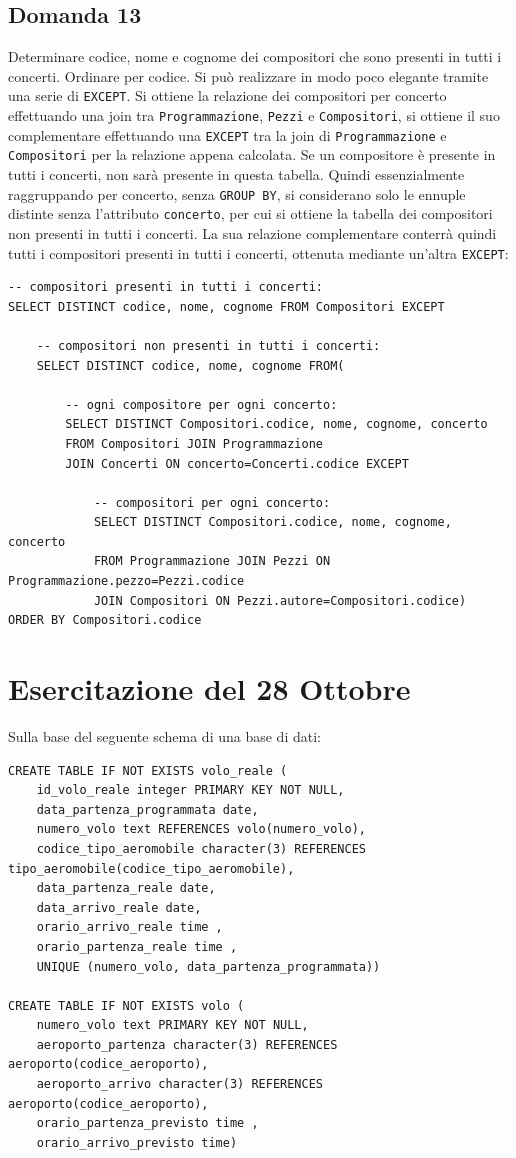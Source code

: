 \documentclass{article}
\numberwithin{equation}{subsection}
\begin{document}
\subsection{Domanda 13}
Determinare codice, nome e cognome dei compositori che sono presenti in tutti i concerti. Ordinare per codice. Si può realizzare in modo poco elegante tramite una serie di \verb|EXCEPT|. Si ottiene la 
relazione dei compositori per concerto effettuando una join tra \verb|Programmazione|, \verb|Pezzi| e \verb|Compositori|, si ottiene il suo complementare effettuando una \verb|EXCEPT| tra la join di \verb|Programmazione| e 
\verb|Compositori| per la relazione appena calcolata. Se un compositore è presente in tutti i concerti, non sarà presente in questa tabella. Quindi essenzialmente raggruppando per concerto, senza \verb|GROUP BY|, si 
considerano solo le ennuple distinte senza l'attributo \verb|concerto|, per cui si ottiene la tabella dei compositori non presenti in tutti i concerti. La sua relazione complementare conterrà quindi tutti i compositori 
presenti in tutti i concerti, ottenuta mediante un'altra \verb|EXCEPT|:
\begin{verbatim}
-- compositori presenti in tutti i concerti:
SELECT DISTINCT codice, nome, cognome FROM Compositori EXCEPT
    
    -- compositori non presenti in tutti i concerti:
    SELECT DISTINCT codice, nome, cognome FROM(

        -- ogni compositore per ogni concerto:
        SELECT DISTINCT Compositori.codice, nome, cognome, concerto
        FROM Compositori JOIN Programmazione 
        JOIN Concerti ON concerto=Concerti.codice EXCEPT

            -- compositori per ogni concerto:
            SELECT DISTINCT Compositori.codice, nome, cognome, concerto
            FROM Programmazione JOIN Pezzi ON Programmazione.pezzo=Pezzi.codice
            JOIN Compositori ON Pezzi.autore=Compositori.codice)
ORDER BY Compositori.codice
\end{verbatim}

\clearpage

\section{Esercitazione del 28 Ottobre}

Sulla base del seguente schema di una base di dati:
\begin{verbatim}
CREATE TABLE IF NOT EXISTS volo_reale (
    id_volo_reale integer PRIMARY KEY NOT NULL,
    data_partenza_programmata date,
    numero_volo text REFERENCES volo(numero_volo),
    codice_tipo_aeromobile character(3) REFERENCES tipo_aeromobile(codice_tipo_aeromobile),
    data_partenza_reale date,
    data_arrivo_reale date,
    orario_arrivo_reale time ,
    orario_partenza_reale time ,
    UNIQUE (numero_volo, data_partenza_programmata))

CREATE TABLE IF NOT EXISTS volo (
    numero_volo text PRIMARY KEY NOT NULL,
    aeroporto_partenza character(3) REFERENCES aeroporto(codice_aeroporto),
    aeroporto_arrivo character(3) REFERENCES aeroporto(codice_aeroporto),
    orario_partenza_previsto time ,
    orario_arrivo_previsto time)
\end{verbatim}
\end{document}
